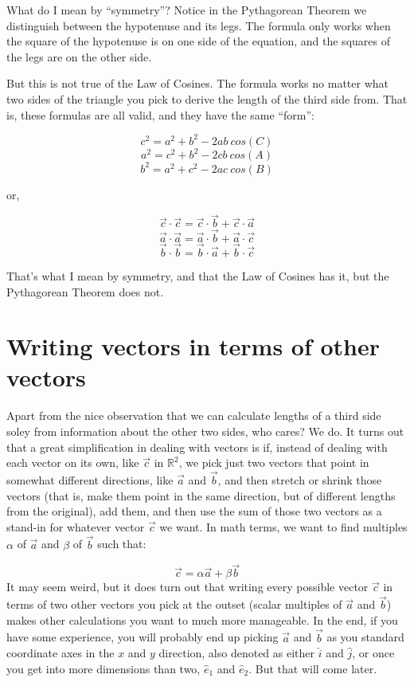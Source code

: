 \documentclass[
]{book}
\begin{document}
What do I mean by ``symmetry''? Notice in the Pythagorean Theorem we distinguish between the hypotenuse and its legs. The formula only works when the square of the hypotenuse is on one side of the equation, and the squares of the legs are on the other side.

But this is not true of the Law of Cosines. The formula works no matter what two sides of the triangle you pick to derive the length of the third side from. That is, these formulas are all valid, and they have the same ``form'':

\[c^2 = a^2 + b^2 - 2 a b \ cos(C)\]
\[a^2 = c^2 + b^2 - 2 c b \ cos(A)\]
\[b^2 = a^2 + c^2 - 2 a c \ cos(B)\]

or,

\[\vec{c}\cdot\vec{c} = \vec{c}\cdot\vec{b} + \vec{c}\cdot\vec{a}\]
\[\vec{a}\cdot\vec{a} = \vec{a}\cdot\vec{b} + \vec{a}\cdot\vec{c}\]
\[\vec{b}\cdot\vec{b} = \vec{b}\cdot\vec{a} + \vec{b}\cdot\vec{c}\]

That's what I mean by symmetry, and that the Law of Cosines has it, but the Pythagorean Theorem does not.

\hypertarget{writing-vectors-in-terms-of-other-vectors}{%
\section{Writing vectors in terms of other vectors}\label{writing-vectors-in-terms-of-other-vectors}}

Apart from the nice observation that we can calculate lengths of a third side soley from information about the other two sides, who cares? We do. It turns out that a great simplification in dealing with vectors is if, instead of dealing with each vector on its own, like \(\vec{c}\) in \(\mathbb{R}^2\), we pick just two vectors that point in somewhat different directions, like \(\vec{a}\) and \(\vec{b}\), and then stretch or shrink those vectors (that is, make them point in the same direction, but of different lengths from the original), add them, and then use the sum of those two vectors as a stand-in for whatever vector \(\vec{c}\) we want. In math terms, we want to find multiples \(\alpha\) of \(\vec{a}\) and \(\beta\) of \(\vec{b}\) such that:

\[\vec{c} = \alpha\vec{a} + \beta\vec{b}\]
It may seem weird, but it does turn out that writing every possible vector \(\vec{c}\) in terms of two other vectors you pick at the outset (scalar multiples of \(\vec{a}\) and \(\vec{b}\)) makes other calculations you want to much more manageable. In the end, if you have some experience, you will probably end up picking \(\vec{a}\) and \(\vec{b}\) as you standard coordinate axes in the \(x\) and \(y\) direction, also denoted as either \(\hat{i}\) and \(\hat{j}\), or once you get into more dimensions than two, \(\hat{e}_{1}\) and \(\hat{e}_{2}\). But that will come later.
\end{document}
